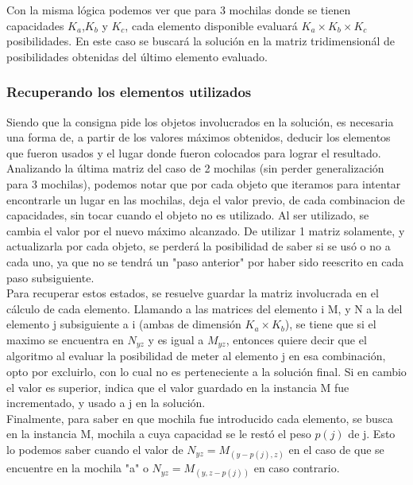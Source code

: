  Con la misma lógica podemos ver que para 3 mochilas donde se tienen capacidades  $K_{a}$,$K_{b}$ y $K_{c}$, cada elemento disponible evaluará $K_{a} \times K_{b} \times K_{c}$ posibilidades. En este caso se buscará la solución en la matriz tridimensionál de posibilidades obtenidas del último elemento evaluado.

\subsubsection*{Recuperando los elementos utilizados}

Siendo que la consigna pide los objetos involucrados en la solución, es necesaria una forma de, a partir de los valores máximos obtenidos, deducir los elementos que fueron usados y el lugar donde fueron colocados para lograr el resultado.\\

Analizando la última matriz del caso de 2 mochilas (sin perder generalización para 3 mochilas), podemos notar que por cada objeto que iteramos para intentar encontrarle un lugar en las mochilas, deja el valor previo, de cada combinacion de capacidades, sin tocar cuando el objeto no es utilizado. Al ser utilizado, se cambia el valor por el nuevo máximo alcanzado. De utilizar 1 matriz solamente, y actualizarla por cada objeto, se perderá la posibilidad de saber si se usó o no a cada uno, ya que no se tendrá un "paso anterior" por haber sido reescrito en cada paso subsiguiente. \\

Para recuperar estos estados, se resuelve guardar la matriz involucrada en el c\'alculo de cada elemento. Llamando a las matrices del elemento i M, y N a la del elemento j subsiguiente a i (ambas de dimensión $K_{a} \times K_{b}$), se tiene que si el maximo se encuentra en $N_{yz}$ y es igual a $M_{yz}$, entonces quiere decir que el algoritmo al evaluar la posibilidad de meter al elemento j en esa combinación, opto por excluirlo, con lo cual no es perteneciente a la solución final. Si en cambio el valor es superior, indica que el valor guardado en la instancia M fue incrementado, y usado a j en la solución.\\

Finalmente, para saber en que mochila fue introducido cada elemento, se busca en la instancia M, mochila a cuya capacidad se le restó el peso $p(j)$ de j. Esto lo podemos saber cuando el valor de $N_{yz} = M_{(y-p(j),z)}$ en el caso de que se encuentre en la mochila "a" o $N_{yz} = M_{(y,z-p(j))}$ en caso contrario.\\

